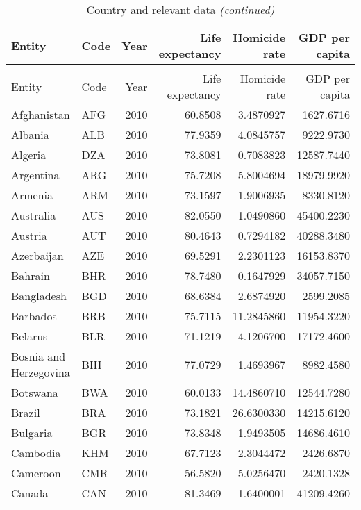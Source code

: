 \begingroup\fontsize{5}{7}\selectfont

\begin{longtable}[t]{llrrrr}
\caption{Country and relevant data}\\
\toprule
Entity & Code & Year & Life expectancy & Homicide rate & GDP per capita\\
\midrule
\endfirsthead
\caption[]{Country and relevant data \textit{(continued)}}\\
\toprule
Entity & Code & Year & Life expectancy & Homicide rate & GDP per capita\\
\midrule
\endhead

\endfoot
\bottomrule
\endlastfoot
Afghanistan & AFG & 2010 & 60.8508 & 3.4870927 & 1627.6716\\
Albania & ALB & 2010 & 77.9359 & 4.0845757 & 9222.9730\\
Algeria & DZA & 2010 & 73.8081 & 0.7083823 & 12587.7440\\
Argentina & ARG & 2010 & 75.7208 & 5.8004694 & 18979.9920\\
Armenia & ARM & 2010 & 73.1597 & 1.9006935 & 8330.8120\\
\addlinespace
Australia & AUS & 2010 & 82.0550 & 1.0490860 & 45400.2230\\
Austria & AUT & 2010 & 80.4643 & 0.7294182 & 40288.3480\\
Azerbaijan & AZE & 2010 & 69.5291 & 2.2301123 & 16153.8370\\
Bahrain & BHR & 2010 & 78.7480 & 0.1647929 & 34057.7150\\
Bangladesh & BGD & 2010 & 68.6384 & 2.6874920 & 2599.2085\\
\addlinespace
Barbados & BRB & 2010 & 75.7115 & 11.2845860 & 11954.3220\\
Belarus & BLR & 2010 & 71.1219 & 4.1206700 & 17172.4600\\
Bosnia and Herzegovina & BIH & 2010 & 77.0729 & 1.4693967 & 8982.4580\\
Botswana & BWA & 2010 & 60.0133 & 14.4860710 & 12544.7280\\
Brazil & BRA & 2010 & 73.1821 & 26.6300330 & 14215.6120\\
\addlinespace
Bulgaria & BGR & 2010 & 73.8348 & 1.9493505 & 14686.4610\\
Cambodia & KHM & 2010 & 67.7123 & 2.3044472 & 2426.6870\\
Cameroon & CMR & 2010 & 56.5820 & 5.0256470 & 2420.1328\\
Canada & CAN & 2010 & 81.3469 & 1.6400001 & 41209.4260\\

\end{longtable}
